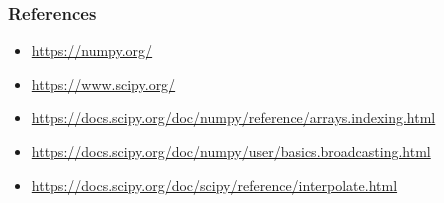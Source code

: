 \documentclass[9pt]{beamer}
\begin{document}
\begin{frame}
  \frametitle{References}
  \scriptsize
  \begin{itemize}
  \item \url{https://numpy.org/}
  \item \url{https://www.scipy.org/}
  \item \url{https://docs.scipy.org/doc/numpy/reference/arrays.indexing.html}
  \item \url{https://docs.scipy.org/doc/numpy/user/basics.broadcasting.html}
  \item \url{https://docs.scipy.org/doc/scipy/reference/interpolate.html}
  \end{itemize}
\end{frame}
\end{document}
